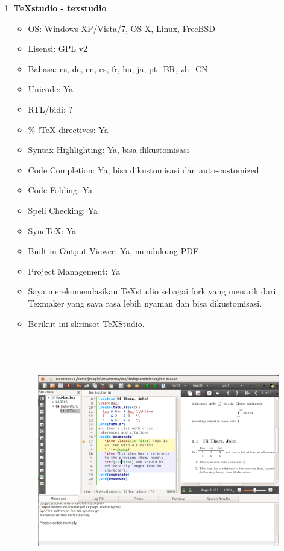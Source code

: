 \documentclass[12pt,a4paper]{article}
\begin{document}
\begin{enumerate}
\item \textbf{TeXstudio - texstudio}
\begin{itemize}
\item OS: Windows XP/Vista/7, OS X, Linux, FreeBSD
\item Lisensi: GPL v2
\item Bahasa: cs, de, en, es, fr, hu, ja, pt\_BR, zh\_CN
\item Unicode: Ya
\item RTL/bidi: ?
\item \% !TeX directives: Ya
\item Syntax Highlighting: Ya, bisa dikustomisasi
\item Code Completion: Ya, bisa dikustomisasi dan auto-customized
\item Code Folding: Ya
\item Spell Checking: Ya
\item SyncTeX: Ya
\item Built-in Output Viewer: Ya, mendukung PDF
\item Project Management: Ya
\item Saya merekomendasikan TeXstudio sebagai fork yang menarik dari Texmaker yang saya rasa lebih nyaman dan bisa dikustomisasi.
\item Berikut ini skrinsot TeXStudio.
\end{itemize}
\begin{figure}[ht]
\centering
\includegraphics[width=15.23cm,height=10.79cm]{gambar/image7.jpg}
\end{figure}


\end{enumerate}
\end{document}
